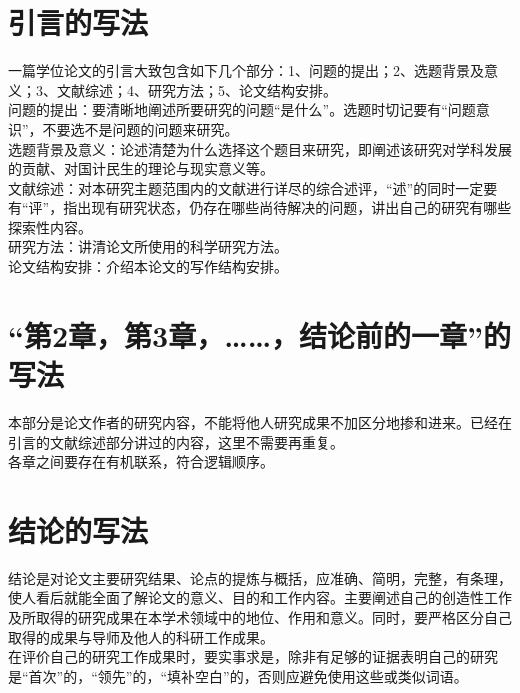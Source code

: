 \section{引言的写法}

一篇学位论文的引言大致包含如下几个部分：1、问题的提出；2、选题背景及意义；3、文献综述；4、研究方法；5、论文结构安排。\\
问题的提出：要清晰地阐述所要研究的问题“是什么”。选题时切记要有“问题意识”，不要选不是问题的问题来研究。\\
选题背景及意义：论述清楚为什么选择这个题目来研究，即阐述该研究对学科发展的贡献、对国计民生的理论与现实意义等。\\
文献综述：对本研究主题范围内的文献进行详尽的综合述评，“述”的同时一定要有“评”，指出现有研究状态，仍存在哪些尚待解决的问题，讲出自己的研究有哪些探索性内容。\\
研究方法：讲清论文所使用的科学研究方法。\\
论文结构安排：介绍本论文的写作结构安排。

\section{“第2章，第3章，……，结论前的一章”的写法}

本部分是论文作者的研究内容，不能将他人研究成果不加区分地掺和进来。已经在引言的文献综述部分讲过的内容，这里不需要再重复。\\
各章之间要存在有机联系，符合逻辑顺序。

\section{结论的写法}

结论是对论文主要研究结果、论点的提炼与概括，应准确、简明，完整，有条理，使人看后就能全面了解论文的意义、目的和工作内容。主要阐述自己的创造性工作及所取得的研究成果在本学术领域中的地位、作用和意义。同时，要严格区分自己取得的成果与导师及他人的科研工作成果。\\
在评价自己的研究工作成果时，要实事求是，除非有足够的证据表明自己的研究是“首次”的，“领先”的，“填补空白”的，否则应避免使用这些或类似词语。